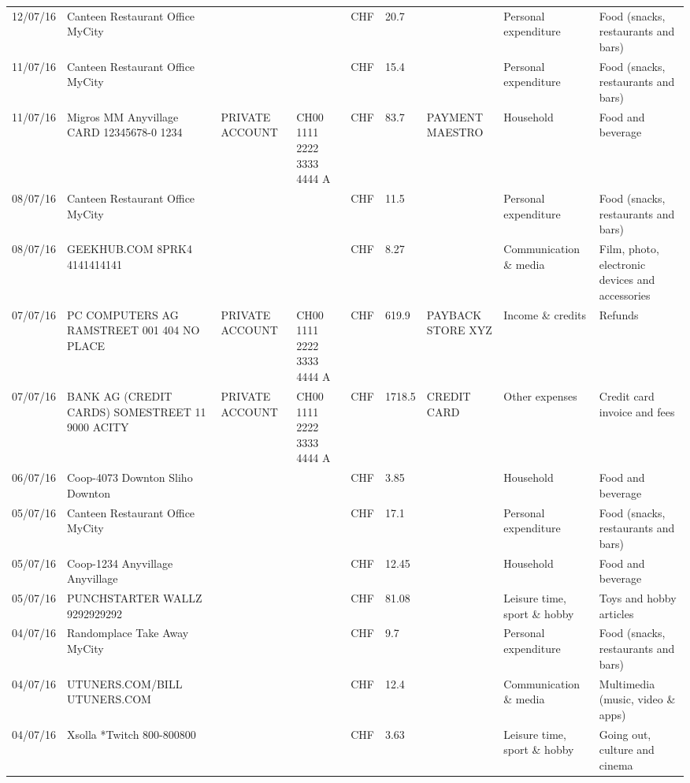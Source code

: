 \begin{landscape}
\begin{adjustwidth}{-2cm}{-2cm}
\begin{tiny}
\begin{longtable}{lp{4cm}llllp{3cm}ll}
		12/07/16 & Canteen Restaurant Office      MyCity &       &       & CHF   & 20.7  &       & Personal expenditure & Food (snacks, restaurants and bars) \\
		11/07/16 & Canteen Restaurant Office      MyCity &       &       & CHF   & 15.4  &       & Personal expenditure & Food (snacks, restaurants and bars) \\
		11/07/16 & Migros MM Anyvillage CARD 12345678-0 1234 & PRIVATE ACCOUNT & CH00 1111 2222 3333 4444 A & CHF   & 83.7  & PAYMENT MAESTRO & Household & Food and beverage \\
		08/07/16 & Canteen Restaurant Office      MyCity &       &       & CHF   & 11.5  &       & Personal expenditure & Food (snacks, restaurants and bars) \\
		08/07/16 & GEEKHUB.COM  8PRK4        4141414141 &       &       & CHF   & 8.27  &       & Communication \& media & Film, photo, electronic devices and accessories \\
		07/07/16 & PC COMPUTERS AG RAMSTREET 001 404 NO PLACE & PRIVATE ACCOUNT & CH00 1111 2222 3333 4444 A & CHF   & 619.9 & PAYBACK STORE XYZ & Income \& credits & Refunds \\
		07/07/16 & BANK AG (CREDIT CARDS) SOMESTREET 11 9000 ACITY & PRIVATE ACCOUNT & CH00 1111 2222 3333 4444 A & CHF   & 1718.5 & CREDIT CARD & Other expenses & Credit card invoice and fees \\
		06/07/16 & Coop-4073 Downton Sliho   Downton &       &       & CHF   & 3.85  &       & Household & Food and beverage \\
		05/07/16 & Canteen Restaurant Office      MyCity &       &       & CHF   & 17.1  &       & Personal expenditure & Food (snacks, restaurants and bars) \\
		05/07/16 & Coop-1234 Anyvillage    Anyvillage &       &       & CHF   & 12.45 &       & Household & Food and beverage \\
		05/07/16 & PUNCHSTARTER WALLZ   9292929292 &       &       & CHF   & 81.08 &       & Leisure time, sport \& hobby & Toys and hobby articles \\
		04/07/16 & Randomplace Take Away     MyCity &       &       & CHF   & 9.7   &       & Personal expenditure & Food (snacks, restaurants and bars) \\
		04/07/16 & UTUNERS.COM/BILL          UTUNERS.COM &       &       & CHF   & 12.4  &       & Communication \& media & Multimedia (music, video \& apps) \\
		04/07/16 & Xsolla *Twitch           800-800800 &       &       & CHF   & 3.63  &       & Leisure time, sport \& hobby & Going out, culture and cinema \\

\end{longtable}
\end{tiny}
\end{adjustwidth}
\end{landscape}
